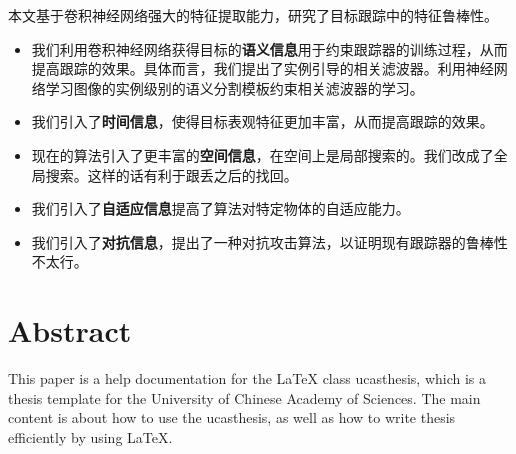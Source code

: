 本文基于卷积神经网络强大的特征提取能力，研究了目标跟踪中的特征鲁棒性。
\begin{itemize}
\item{我们利用卷积神经网络获得目标的\textbf{语义信息}用于约束跟踪器的训练过程，从而提高跟踪的效果。具体而言，我们提出了实例引导的相关滤波器。利用神经网络学习图像的实例级别的语义分割模板约束相关滤波器的学习。}
\item{我们引入了\textbf{时间信息}，使得目标表观特征更加丰富，从而提高跟踪的效果。}
\item{现在的算法引入了更丰富的\textbf{空间信息}，在空间上是局部搜索的。我们改成了全局搜索。这样的话有利于跟丢之后的找回。}
\item{我们引入了\textbf{自适应信息}提高了算法对特定物体的自适应能力。}
\item{我们引入了\textbf{对抗信息}，提出了一种对抗攻击算法，以证明现有跟踪器的鲁棒性不太行。}
\end{itemize}

\intobmk\chapter*{Abstract}%

This paper is a help documentation for the \LaTeX{} class ucasthesis, which is  a thesis template for the University of Chinese Academy of Sciences. The main content is about how to use the ucasthesis, as well as how to write thesis efficiently by using \LaTeX{}.

